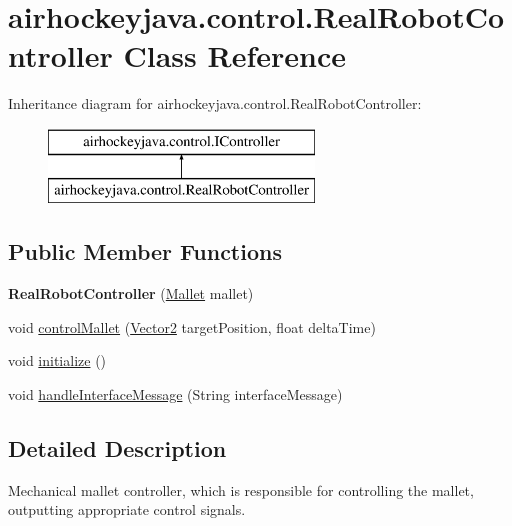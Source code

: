 \hypertarget{classairhockeyjava_1_1control_1_1_real_robot_controller}{}\section{airhockeyjava.\+control.\+Real\+Robot\+Controller Class Reference}
\label{classairhockeyjava_1_1control_1_1_real_robot_controller}
Inheritance diagram for airhockeyjava.\+control.\+Real\+Robot\+Controller\+:\begin{figure}[H]
\begin{center}
\leavevmode
\includegraphics[height=2.000000cm]{classairhockeyjava_1_1control_1_1_real_robot_controller}
\end{center}
\end{figure}
\subsection*{Public Member Functions}
\begin{DoxyCompactItemize}
\item 
\hypertarget{classairhockeyjava_1_1control_1_1_real_robot_controller_aa27633a67b7fe893d0b00dea098b84ac}{}{\bfseries Real\+Robot\+Controller} (\hyperlink{classairhockeyjava_1_1physical_1_1_mallet}{Mallet} mallet)\label{classairhockeyjava_1_1control_1_1_real_robot_controller_aa27633a67b7fe893d0b00dea098b84ac}

\item 
void \hyperlink{classairhockeyjava_1_1control_1_1_real_robot_controller_a6cd39edab2adc50e6455e5d90499ca45}{control\+Mallet} (\hyperlink{classairhockeyjava_1_1util_1_1_vector2}{Vector2} target\+Position, float delta\+Time)
\item 
void \hyperlink{classairhockeyjava_1_1control_1_1_real_robot_controller_a12d184d548d39367f6818884e7c4bc4c}{initialize} ()
\item 
void \hyperlink{classairhockeyjava_1_1control_1_1_real_robot_controller_a2c8d78d1fc2241b822fcf794236fa96d}{handle\+Interface\+Message} (String interface\+Message)
\end{DoxyCompactItemize}


\subsection{Detailed Description}
Mechanical mallet controller, which is responsible for controlling the mallet, outputting appropriate control signals.

